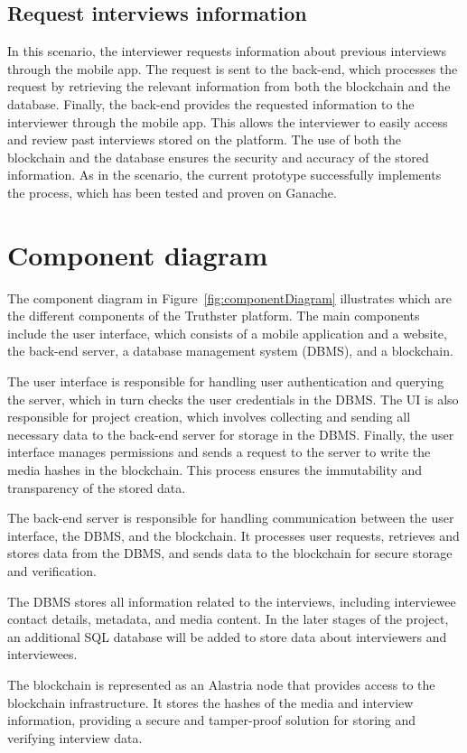 \documentclass[target=mst,aauheader=]{thud}
\begin{document}
\subsection{Request interviews information}
\label{requestInterviewsInformation}

In this scenario, the interviewer requests information about previous interviews through the mobile app. The request is sent to the back-end, which processes the request by retrieving the relevant information from both the blockchain and the database. Finally, the back-end provides the requested information to the interviewer through the mobile app. This allows the interviewer to easily access and review past interviews stored on the platform. The use of both the blockchain and the database ensures the security and accuracy of the stored information. As in the  scenario, the current prototype successfully implements the process, which has been tested and proven on Ganache.

\section{Component diagram}

The component diagram in Figure~\ref{fig:componentDiagram} illustrates which are the different components of the Truthster platform. The main components include the user interface, which consists of a mobile application and a website, the back-end server, a database management system (DBMS), and a blockchain.\par

The user interface is responsible for handling user authentication and querying the server, which in turn checks the user credentials in the DBMS. The UI is also responsible for project creation, which involves collecting and sending all necessary data to the back-end server for storage in the DBMS. Finally, the user interface manages permissions and sends a request to the server to write the media hashes in the blockchain. This process ensures the immutability and transparency of the stored data.\par
The back-end server is responsible for handling communication between the user interface, the DBMS, and the blockchain. It processes user requests, retrieves and stores data from the DBMS, and sends data to the blockchain for secure storage and verification.\par
The DBMS stores all information related to the interviews, including interviewee contact details, metadata, and media content. In the later stages of the project, an additional SQL database will be added to store data about interviewers and interviewees.\par
The blockchain is represented as an Alastria node that provides access to the blockchain infrastructure. It stores the hashes of the media and interview information, providing a secure and tamper-proof solution for storing and verifying interview data.
\end{document}
